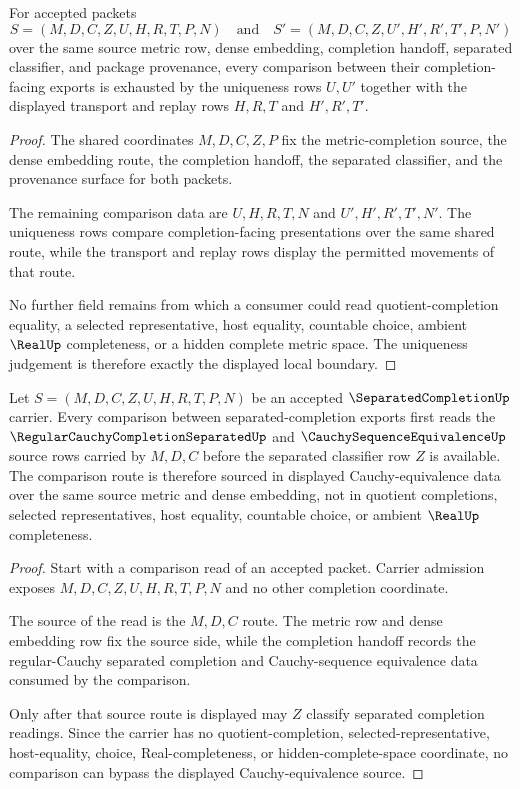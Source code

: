 \begin{theorem}
\label{thm:separated-completion-uniqueness-boundary}
For accepted packets
$$
S=(M,D,C,Z,U,H,R,T,P,N)
\quad\text{and}\quad
S'=(M,D,C,Z,U',H',R',T',P,N')
$$
over the same source metric row, dense embedding, completion handoff, separated classifier, and package provenance, every comparison between their completion-facing exports is exhausted by the uniqueness rows $U,U'$ together with the displayed transport and replay rows $H,R,T$ and $H',R',T'$.
\end{theorem}
\begin{proof}
The shared coordinates $M,D,C,Z,P$ fix the metric-completion source, the dense embedding route, the completion handoff, the separated classifier, and the provenance surface for both packets.

The remaining comparison data are $U,H,R,T,N$ and $U',H',R',T',N'$. The uniqueness rows compare completion-facing presentations over the same shared route, while the transport and replay rows display the permitted movements of that route.

No further field remains from which a consumer could read quotient-completion equality, a selected representative, host equality, countable choice, ambient $\RealUp$ completeness, or a hidden complete metric space. The uniqueness judgement is therefore exactly the displayed local boundary.
\end{proof}

\begin{theorem}
\label{thm:separatedcompletion-cauchy-equivalence-source}
Let $S=(M,D,C,Z,U,H,R,T,P,N)$ be an accepted $\SeparatedCompletionUp$ carrier. Every comparison between separated-completion exports first reads the $\RegularCauchyCompletionSeparatedUp$ and $\CauchySequenceEquivalenceUp$ source rows carried by $M,D,C$ before the separated classifier row $Z$ is available. The comparison route is therefore sourced in displayed Cauchy-equivalence data over the same source metric and dense embedding, not in quotient completions, selected representatives, host equality, countable choice, or ambient $\RealUp$ completeness.
\end{theorem}
\begin{proof}
Start with a comparison read of an accepted packet. Carrier admission exposes $M,D,C,Z,U,H,R,T,P,N$ and no other completion coordinate.

The source of the read is the $M,D,C$ route. The metric row and dense embedding row fix the source side, while the completion handoff records the regular-Cauchy separated completion and Cauchy-sequence equivalence data consumed by the comparison.

Only after that source route is displayed may $Z$ classify separated completion readings. Since the carrier has no quotient-completion, selected-representative, host-equality, choice, Real-completeness, or hidden-complete-space coordinate, no comparison can bypass the displayed Cauchy-equivalence source.
\end{proof}

